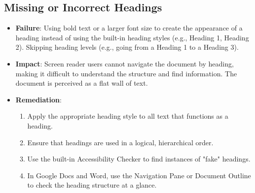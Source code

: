 \subsection{Missing or Incorrect Headings}
\label{subsec:failures-headings}
\begin{itemize}
	\item \textbf{Failure}: Using bold text or a larger font size to create the appearance of a heading instead of using the built-in heading styles (e.g., Heading 1, Heading 2). Skipping heading levels (e.g., going from a Heading 1 to a Heading 3).
	\item \textbf{Impact}: Screen reader users cannot navigate the document by heading, making it difficult to understand the structure and find information. The document is perceived as a flat wall of text.
	\item \textbf{Remediation}:
	      \begin{enumerate}
		      \item Apply the appropriate heading style to all text that functions as a heading.
		      \item Ensure that headings are used in a logical, hierarchical order.
		      \item Use the built-in Accessibility Checker to find instances of "fake" headings.
		      \item In Google Docs and Word, use the Navigation Pane or Document Outline to check the heading structure at a glance.
	      \end{enumerate}
\end{itemize}

